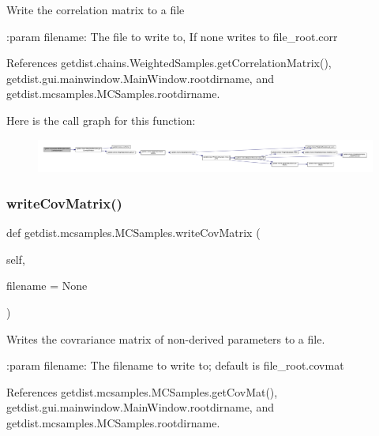 \begin{DoxyVerb}Write the correlation matrix to a file

:param filename: The file to write to, If none writes to file_root.corr
\end{DoxyVerb}
 

References getdist.\+chains.\+Weighted\+Samples.\+get\+Correlation\+Matrix(), getdist.\+gui.\+mainwindow.\+Main\+Window.\+rootdirname, and getdist.\+mcsamples.\+M\+C\+Samples.\+rootdirname.

Here is the call graph for this function\+:
\nopagebreak
\begin{figure}[H]
\begin{center}
\leavevmode
\includegraphics[width=350pt]{classgetdist_1_1mcsamples_1_1MCSamples_a29a520ddd47facaf90753bb81f638696_cgraph}
\end{center}
\end{figure}
\mbox{\label{classgetdist_1_1mcsamples_1_1MCSamples_ac0630cea17b369b81474a446073d8604}} 
\subsubsection{\texorpdfstring{write\+Cov\+Matrix()}{writeCovMatrix()}}
{\footnotesize\ttfamily def getdist.\+mcsamples.\+M\+C\+Samples.\+write\+Cov\+Matrix (\begin{DoxyParamCaption}\item[{}]{self,  }\item[{}]{filename = {\ttfamily None} }\end{DoxyParamCaption})}

\begin{DoxyVerb}Writes the covrariance matrix of non-derived parameters to a file.

:param filename: The filename to write to; default is file_root.covmat
\end{DoxyVerb}
 

References getdist.\+mcsamples.\+M\+C\+Samples.\+get\+Cov\+Mat(), getdist.\+gui.\+mainwindow.\+Main\+Window.\+rootdirname, and getdist.\+mcsamples.\+M\+C\+Samples.\+rootdirname.

